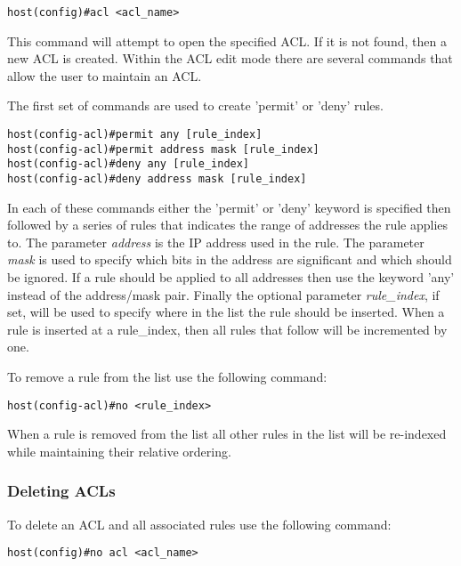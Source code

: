 \begin{Verbatim}[frame=single]
host(config)#acl <acl_name>
\end{Verbatim}

This command will attempt to open the specified ACL.
If it is not found, then a new ACL is created.
Within the ACL edit mode there are several commands that allow the user to maintain an ACL.

The first set of commands are used to create 'permit' or 'deny' rules.\\

\begin{Verbatim}[frame=single]
host(config-acl)#permit any [rule_index]
host(config-acl)#permit address mask [rule_index]
host(config-acl)#deny any [rule_index]
host(config-acl)#deny address mask [rule_index]
\end{Verbatim}

In each of these commands either the 'permit' or 'deny' keyword is specified then followed by a series of rules that indicates the range of addresses the rule applies to.
The parameter \emph{address} is the IP address used in the rule.
The parameter \emph{mask} is used to specify which bits in the address are significant and which should be ignored.
If a rule should be applied to all addresses then use the keyword 'any' instead of the address/mask pair.
Finally the optional parameter \emph{rule\_index}, if set, will be used to specify where in the list the rule should be inserted.
When a rule is inserted at a rule\_index, then all rules that follow will be incremented by one.

To remove a rule from the list use the following command:\\

\begin{Verbatim}[frame=single]
host(config-acl)#no <rule_index>
\end{Verbatim}

When a rule is removed from the list all other rules in the list will be re-indexed while maintaining their relative ordering.

\subsubsection{Deleting ACLs}
\label{sec:configure:acl:delete}

To delete an ACL and all associated rules use the following command:\\

\begin{Verbatim}[frame=single]
host(config)#no acl <acl_name>
\end{Verbatim}

